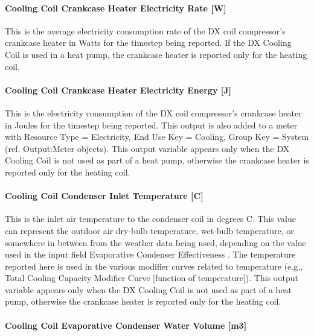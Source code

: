 \paragraph{Cooling Coil Crankcase Heater Electricity Rate {[}W{]}}\label{cooling-coil-crankcase-heater-electric-powerw}

This is the average electricity consumption rate of the DX coil compressor's crankcase heater in Watts for the timestep being reported. If the DX Cooling Coil is used in a heat pump, the crankcase heater is reported only for the heating coil.

\paragraph{Cooling Coil Crankcase Heater Electricity Energy {[}J{]}}\label{cooling-coil-crankcase-heater-electric-energy-j}

This is the electricity consumption of the DX coil compressor's crankcase heater in Joules for the timestep being reported. This output is also added to a meter with Resource Type = Electricity, End Use Key = Cooling, Group Key = System (ref. Output:Meter objects). This output variable appears only when the DX Cooling Coil is not used as part of a heat pump, otherwise the crankcase heater is reported only for the heating coil.

\paragraph{Cooling Coil Condenser Inlet Temperature {[}C{]}}\label{cooling-coil-condenser-inlet-temperature-c}

This is the inlet air temperature to the condenser coil in degrees C. This value can represent the outdoor air dry-bulb temperature, wet-bulb temperature, or somewhere in between from the weather data being used, depending on the value used in the input field Evaporative Condenser Effectiveness . The temperature reported here is used in the various modifier curves related to temperature (e.g., Total Cooling Capacity Modifier Curve {[}function of temperature{]}). This output variable appears only when the DX Cooling Coil is not used as part of a heat pump, otherwise the crankcase heater is reported only for the heating coil.

\paragraph{Cooling Coil Evaporative Condenser Water Volume {[}m3{]}}\label{cooling-coil-evaporative-condenser-water-volume-m3}

